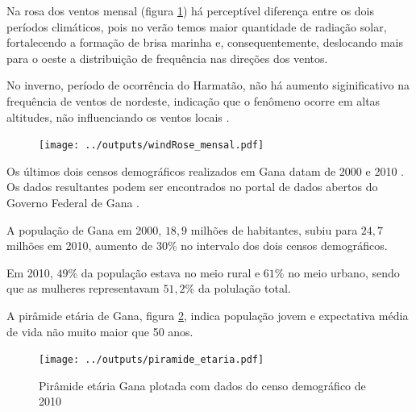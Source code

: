 Na rosa dos ventos mensal (figura \ref{fig:windRose_mensal})
há perceptível diferença entre os dois períodos climáticos, 
pois no verão temos maior quantidade de radiação solar, fortalecendo a 
formação de brisa marinha e, consequentemente, deslocando mais para o 
oeste a distribuição de frequência nas direções dos ventos.

No inverno, período de ocorrência do Harmatão, não há aumento siginificativo 
na frequência de ventos de nordeste, indicação que o fenômeno ocorre em 
altas altitudes, não influenciando os ventos locais \citep{breuning2005}. 

\begin{figure}[H]
  \centering
  \texttt{[image: ../outputs/windRose\_mensal.pdf]}
  \caption{ \citep{carslaw2012} \label{fig:windRose_mensal}}
\end{figure}



Os últimos dois censos demográficos realizados em Gana datam
de 2000 \citep{ghanacensus2003} e 2010 \citep{ghanacensus2013}. Os
dados resultantes podem ser encontrados no portal de dados abertos
do Governo Federal de Gana \citep{opendataghana}.

A população de Gana em 2000, $18,9$ milhões de habitantes, subiu para $24,7$ 
milhões em 2010, aumento de $30\%$ no intervalo dos dois censos demográficos.

Em 2010, $49\%$ da população estava no meio rural e $61\%$ no meio urbano, sendo
que as mulheres representavam $51,2\%$ da polulação total.

A pirâmide etária de Gana, figura \ref{fig:piramedegana}, indica população 
jovem e expectativa média de vida não muito maior que 50 anos. 

\begin{figure}[H]
  \centering
  \texttt{[image: ../outputs/piramide\_etaria.pdf]}
  \caption{Pirâmide etária Gana plotada com dados do censo 
           demográfico de 2010 \citep{ghanacensus2013} \label{fig:piramedegana}}
\end{figure}


